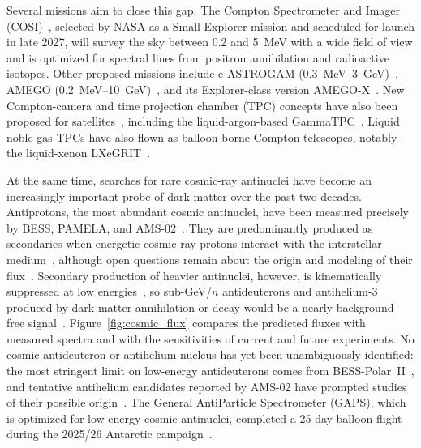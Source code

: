 \documentclass[a4paper,fleqn,longmktitle]{cas-dc}
\begin{document}
Several missions aim to close this gap.
The Compton Spectrometer and Imager (COSI)~\cite{Tomsick2023Compton}, selected by NASA as a Small Explorer mission and scheduled for launch in late 2027, will survey the sky between 0.2 and 5~MeV with a wide field of view and is optimized for spectral lines from positron annihilation and radioactive isotopes.
Other proposed missions include e-ASTROGAM (0.3~MeV--3~GeV)~\cite{DEANGELIS20181}, AMEGO (0.2~MeV--10~GeV)~\cite{10.1117/12.2562352}, and its Explorer-class version AMEGO-X~\cite{caputo2022amegox}.
New Compton-camera and time projection chamber (TPC) concepts have also been proposed for satellites~\cite{sun2026developmentnovelcomptoncamera, shutt2025gammatpcgammaraytelescopeconcept}, including the liquid-argon-based GammaTPC~\cite{shutt2025gammatpcgammaraytelescopeconcept}.
Liquid noble-gas TPCs have also flown as balloon-borne Compton telescopes, notably the liquid-xenon LXeGRIT~\cite{aprile1998lxegrit, curioni2007lxegrit}.
 
At the same time, searches for rare cosmic-ray antinuclei have become an increasingly important probe of dark matter over the past two decades.
Antiprotons, the most abundant cosmic antinuclei, have been measured precisely by BESS, PAMELA, and AMS-02~\cite{YAMAMOTO2013227, PhysRevLett.108.051102, adriani2010pamela, PhysRevLett.117.091103}.
They are predominantly produced as secondaries when energetic cosmic-ray protons interact with the interstellar medium~\cite{Moskalenko_2002, kiraly1981antiprotons}, although open questions remain about the origin and modeling of their flux~\cite{PhysRevLett.118.191101}.
Secondary production of heavier antinuclei, however, is kinematically suppressed at low energies~\cite{PhysRevD.71.083013, PhysRevD.102.063004, Tomassetti:2017DQ}, so sub-GeV/$n$ antideuterons and antihelium-3 produced by dark-matter annihilation or decay would be a nearly background-free signal~\cite{PhysRevD.62.043003, Baer_2005, PhysRevD.78.043506, Alejandro_Ibarra_2013, PhysRevD.88.023014, N.Fornengo_2013, PhysRevD.89.103504, PhysRevD.97.103011, lin2018expectationscosmicantideuteronflux, Ding_2019, 10.1007/jhep082014009, PhysRevD.89.076005, Doetinchem_2020, ZENG2025103152}.
Figure~\ref{fig:cosmic_flux} compares the predicted fluxes with measured spectra and with the sensitivities of current and future experiments.
No cosmic antideuteron or antihelium nucleus has yet been unambiguously identified: the most stringent limit on low-energy antideuterons comes from BESS-Polar~II~\cite{PhysRevLett.132.131001}, and tentative antihelium candidates reported by AMS-02 have prompted studies of their possible origin~\cite{PhysRevD.96.083020}.
The General AntiParticle Spectrometer (GAPS), which is optimized for low-energy cosmic antinuclei, completed a 25-day balloon flight during the 2025/26 Antarctic campaign~\cite{thegapscollaboration2026generalantiparticlespectrometergaps}.
 
\end{document}
